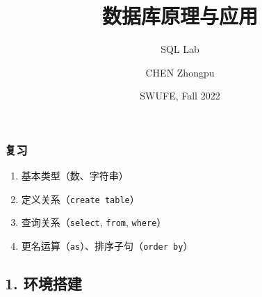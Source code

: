 \documentclass[aspectratio=169, 14pt]{beamer}
\title[Database Principles and Applications] %
{数据库原理与应用}
\subtitle{SQL Lab}
\author[CHEN Zhongpu] %
{CHEN Zhongpu}
\institute[] %
{
  School of Computing and Artificial Intelligence \\
  \href{mailto:zpchen@swufe.edu.cn}{zpchen@swufe.edu.cn}
}
\date[] %
{SWUFE, Fall 2022}
\begin{document}
\frame{\titlepage}

\begin{frame}
    \frametitle{复习}
    \begin{enumerate}
        \item 基本类型（数、字符串）
        \item 定义关系（\texttt{create table}）
        \item 查询关系（\texttt{select}, \texttt{from}, \texttt{where}）
        \item 更名运算（\texttt{as}）、排序子句（\texttt{order by}）    
    \end{enumerate}
\end{frame}

{
    \begin{frame}
        \section{\textcolor{darkmidnightblue}{1. 环境搭建}}
    \end{frame}
}
\end{document}
